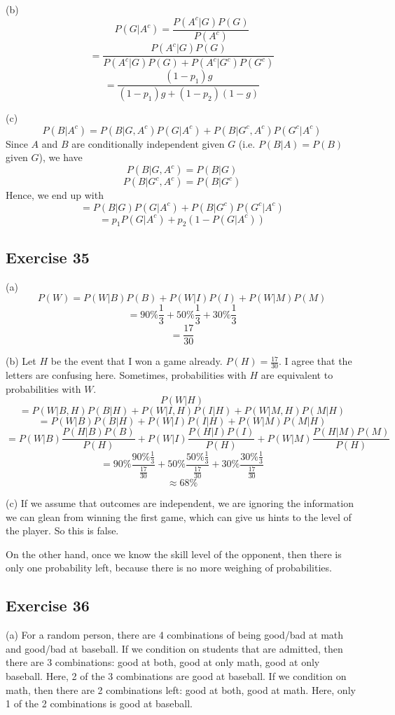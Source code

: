 \documentclass{book}
\begin{document}
\noindent
(b)
$$P(G | A^c) = \frac{P(A^c | G) P(G)}{P(A^c)}$$
$$= \frac{P(A^c | G) P(G)}{P(A^c | G) P(G) + P(A^c | G^c) P(G^c)}$$
$$= \frac{(1 - p_1) g}{(1 - p_1) g + (1 - p_2) (1 - g)}$$

\noindent
(c)
$$P(B | A^c) = P(B | G, A^c) P(G | A^c) + P(B | G^c, A^c) P(G^c | A^c)$$
Since $A$ and $B$ are conditionally independent given $G$ (i.e. $P(B | A) = P(B)$ given $G$), we have
$$P(B | G, A^c) = P(B | G)$$
$$P(B | G^c, A^c) = P(B | G^c)$$
Hence, we end up with
$$= P(B | G) P(G | A^c) + P(B | G^c) P(G^c | A^c)$$
$$= p_1 P(G | A^c) + p_2 (1 - P(G | A^c))$$

\subsection*{Exercise 35}
(a)
$$P(W) = P(W | B) P(B) + P(W | I) P(I) + P(W | M) P(M)$$
$$= 90\% \frac{1}{3} + 50\% \frac{1}{3} + 30\% \frac{1}{3}$$
$$= \frac{17}{30}$$

\noindent
(b)
Let $H$ be the event that I won a game already. $P(H) = \frac{17}{30}$. I agree that the letters are confusing here. Sometimes, probabilities with $H$ are equivalent to probabilities with $W$.
$$P(W | H)$$
$$= P(W | B, H) P(B | H) + P(W | I, H) P(I | H) + P(W | M, H) P(M | H)$$
$$= P(W | B) P(B | H) + P(W | I) P(I | H) + P(W | M) P(M | H)$$
$$= P(W | B) \frac{P(H | B) P(B)}{P(H)} + P(W | I) \frac{P(H | I) P(I)}{P(H)} + P(W | M) \frac{P(H | M) P(M)}{P(H)}$$
$$= 90\% \frac{90\% \frac{1}{3}}{\frac{17}{30}} + 50\% \frac{50\% \frac{1}{3}}{\frac{17}{30}} + 30\% \frac{30\% \frac{1}{3}}{\frac{17}{30}}$$
$$\approx 68\%$$

\noindent
(c) If we assume that outcomes are independent, we are ignoring the information we can glean from winning the first game, which can give us hints to the level of the player. So this is false.

On the other hand, once we know the skill level of the opponent, then there is only one probability left, because there is no more weighing of probabilities.

\subsection*{Exercise 36}
(a) For a random person, there are 4 combinations of being good/bad at math and good/bad at baseball. If we condition on students that are admitted, then there are 3 combinations: good at both, good at only math, good at only baseball. Here, 2 of the 3 combinations are good at baseball. If we condition on math, then there are 2 combinations left: good at both, good at math. Here, only 1 of the 2 combinations is good at baseball.
\end{document}
